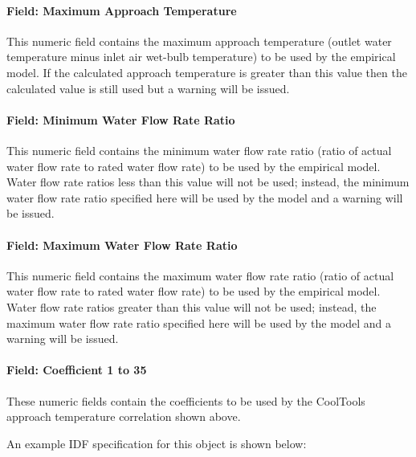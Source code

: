 \paragraph{Field: Maximum Approach Temperature}\label{field-maximum-approach-temperature}

This numeric field contains the maximum approach temperature (outlet water temperature minus inlet air wet-bulb temperature) to be used by the empirical model. If the calculated approach temperature is greater than this value then the calculated value is still used but a warning will be issued.

\paragraph{Field: Minimum Water Flow Rate Ratio}\label{field-minimum-water-flow-rate-ratio}

This numeric field contains the minimum water flow rate ratio (ratio of actual water flow rate to rated water flow rate) to be used by the empirical model. Water flow rate ratios less than this value will not be used; instead, the minimum water flow rate ratio specified here will be used by the model and a warning will be issued.

\paragraph{Field: Maximum Water Flow Rate Ratio}\label{field-maximum-water-flow-rate-ratio}

This numeric field contains the maximum water flow rate ratio (ratio of actual water flow rate to rated water flow rate) to be used by the empirical model. Water flow rate ratios greater than this value will not be used; instead, the maximum water flow rate ratio specified here will be used by the model and a warning will be issued.

\paragraph{Field: Coefficient 1 to 35}\label{field-coefficient-1-to-35}

These numeric fields contain the coefficients to be used by the CoolTools approach temperature correlation shown above.

An example IDF specification for this object is shown below:

